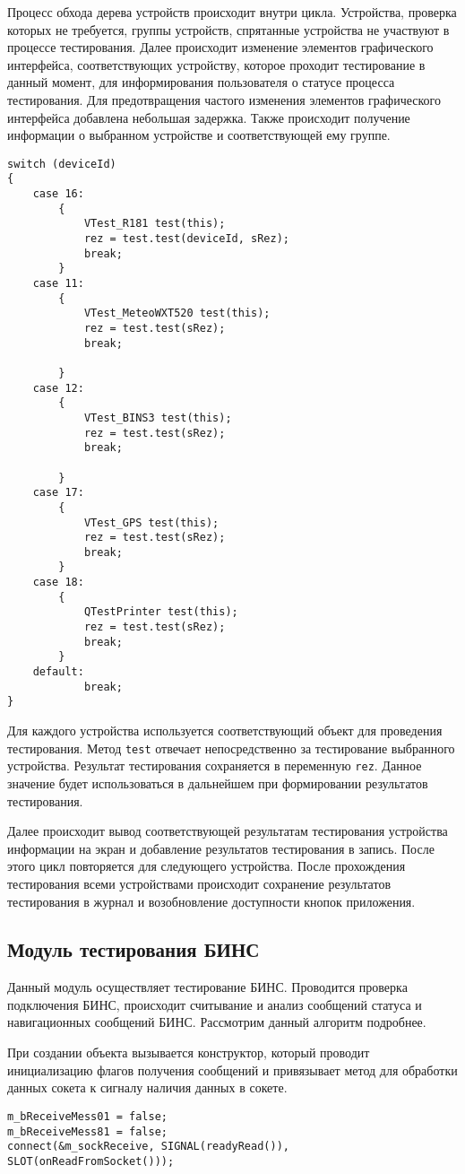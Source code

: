 Процесс обхода дерева устройств происходит внутри цикла. Устройства, проверка которых не требуется, группы устройств,
спрятанные устройства  не участвуют в процессе тестирования. Далее происходит изменение элементов графического
интерфейса, соответствующих устройству, которое проходит тестирование в данный момент, для информирования пользователя о
статусе процесса тестирования. Для предотвращения частого изменения элементов графического интерфейса добавлена
небольшая задержка. Также происходит получение информации о выбранном устройстве и соответствующей ему группе.
\medskip
\begin{verbatim}
switch (deviceId)
{
	case 16:
		{
			VTest_R181 test(this);
			rez = test.test(deviceId, sRez);
			break;
		}
	case 11:
		{
			VTest_MeteoWXT520 test(this);
			rez = test.test(sRez);
			break;

		}
	case 12:
		{
			VTest_BINS3 test(this);
			rez = test.test(sRez);
			break;

		}
	case 17:
		{
			VTest_GPS test(this);
			rez = test.test(sRez);
			break;
		}
	case 18:
		{
			QTestPrinter test(this);
			rez = test.test(sRez);
			break;
		}
	default:
			break;
}
\end{verbatim}
\medskip

Для каждого устройства используется соответствующий объект для проведения тестирования. Метод \texttt{test} отвечает
непосредственно за тестирование выбранного устройства. Результат тестирования сохраняется в переменную \texttt{rez}.
Данное значение будет использоваться в дальнейшем при формировании результатов тестирования.

Далее происходит вывод соответствующей результатам тестирования устройства информации на экран и добавление результатов
тестирования в запись. После этого цикл повторяется для следующего устройства. После прохождения тестирования всеми
устройствами происходит сохранение результатов тестирования в журнал и возобновление доступности кнопок приложения.

\subsection{Модуль тестирования БИНС}
Данный модуль осуществляет тестирование БИНС. Проводится проверка подключения БИНС, происходит считывание и анализ
сообщений статуса и навигационных сообщений БИНС. Рассмотрим данный алгоритм подробнее.

При создании объекта вызывается конструктор, который проводит инициализацию флагов получения сообщений и привязывает
метод для обработки данных сокета к сигналу наличия данных в сокете.
\medskip
\begin{verbatim}
m_bReceiveMess01 = false;
m_bReceiveMess81 = false;
connect(&m_sockReceive, SIGNAL(readyRead()), SLOT(onReadFromSocket()));
\end{verbatim}
\medskip

